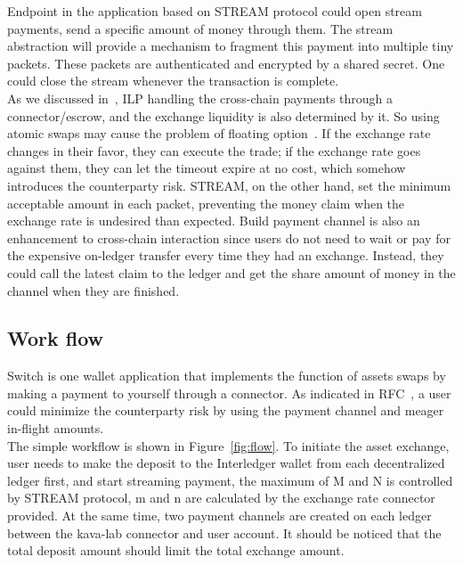 \noindent Endpoint in the application based on STREAM protocol could open stream payments, send a specific amount of money through them. The stream abstraction will provide a mechanism to fragment this payment into multiple tiny packets. These packets are authenticated and encrypted by a shared secret. One could close the stream whenever the transaction is complete.\\

\noindent As we discussed in~, ILP handling the cross-chain payments through a connector/escrow, and the exchange liquidity is also determined by it. So using atomic swaps may cause the problem of floating option~\cite{cryptoeprint:2019:896}. If the exchange rate changes in their favor, they can execute the trade; if the exchange rate goes against them, they can let the timeout expire at no cost, which somehow introduces the counterparty risk. STREAM, on the other hand, set the minimum acceptable amount in each packet, preventing the money claim when the exchange rate is undesired than expected. Build payment channel is also an enhancement to cross-chain interaction since users do not need to wait or pay for the expensive on-ledger transfer every time they had an exchange. Instead, they could call the latest claim to the ledger and get the share amount of money in the channel when they are finished.

\subsection{Work flow}
\noindent Switch is one wallet application that implements the function of assets swaps by making a payment to yourself through a connector. As indicated in RFC~\cite{paymentchannel}, a user could minimize the counterparty risk by using the payment channel and meager in-flight amounts.\\
\noindent The simple workflow is shown in Figure~\ref{fig:flow}. To initiate the asset exchange, user needs to make the deposit to the Interledger wallet from each decentralized ledger first, and start streaming payment, the maximum of M and N is controlled by STREAM protocol, m and n are calculated by the exchange rate connector provided. At the same time, two payment channels are created on each ledger between the kava-lab connector and user account. It should be noticed that the total deposit amount should limit the total exchange amount.

